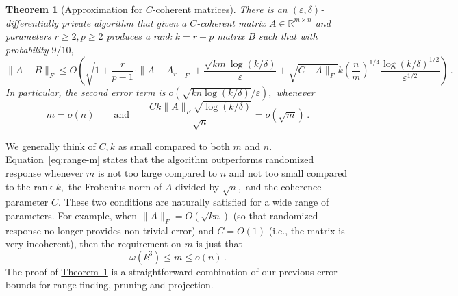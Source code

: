 \documentclass[letterpaper,11pt]{article}
\newtheorem{theorem}{Theorem}[section]
\theoremstyle{definition}
\newcommand{\equationlabel}[1]{\label{eq:#1}}
\newcommand{\equationref}[1]{\hyperref[eq:#1]{Equation~\ref{eq:#1}}}
\newcommand{\theoremlabel}[1]{\label{thm:#1}}
\newcommand{\theoremref}[1]{\hyperref[thm:#1]{Theorem~\ref{thm:#1}}}
\newcommand{\mper}{\,.}
\renewcommand{\le}{\leqslant}
\renewcommand{\ge}{\geqslant}
\newcommand{\R}{\mathbb{R}}
\renewcommand{\epsilon}{\varepsilon}
\begin{document}
\begin{theorem}[Approximation for $C$-coherent matrices]
\theoremlabel{C-approx}
There is an $(\epsilon,\delta)$-differentially private algorithm that
given a $C$-coherent matrix $A\in\R^{m\times n}$ and parameters
$r\ge2,p\ge2$ produces a rank $k=r+p$ matrix $B$ such that with
probability $9/10,$
\begin{equation}\equationlabel{C-precise}
\|A-B\|_F
\le
O\left(
\sqrt{1+\frac r{p-1}}\cdot \|A-A_r\|_F
+
\frac{\sqrt{km}\log(k/\delta)}\epsilon
+\sqrt{C\|A\|_F}k\left(\frac nm\right)^{1/4}
\frac{\log(k/\delta)^{1/2}}{\epsilon^{1/2}}
\right)\mper
\end{equation}
In particular, the second error term is $o\left(\sqrt{kn\log(k/\delta)}/\epsilon\right),$ whenever
\begin{equation}\equationlabel{range-m}
m = o(n) \qquad\text{and}\qquad
\frac{Ck\|A\|_F\sqrt{\log(k/\delta)}}{\sqrt{n}} = o\left(\sqrt{m}\right)\mper
\end{equation}
\end{theorem}
We generally think of $C,k$ as small compared to both $m$ and $n.$
\equationref{range-m} states that the algorithm outperforms randomized
response whenever $m$ is not too large compared to $n$ and not too small
compared to the rank $k,$ the Frobenius norm of $A$ divided by $\sqrt{n},$
and the coherence parameter $C.$ These two conditions are
naturally satisfied for a wide range of parameters. For example, when
$\|A\|_F=O(\sqrt{kn})$ (so that randomized response no longer provides
non-trivial error) and $C=O(1)$ (i.e., the matrix is very incoherent), then
the requirement on $m$ is just that
\[
\omega(k^{3})\le m \le o(n)\mper
\]
The proof of
\theoremref{C-approx} is a straightforward combination of our previous
error bounds for range finding, pruning and projection.
\end{document}
